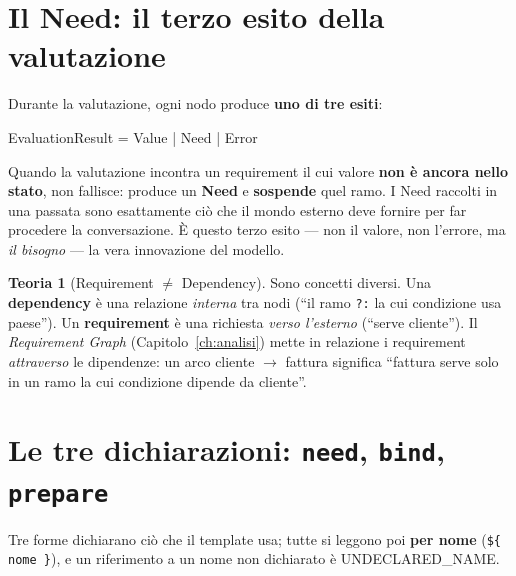 \documentclass[11pt,a4paper]{book}
\let\code\lstinline
\newcommand{\ic}[1]{{\ttfamily #1}}
\theoremstyle{definition}
\newtheorem*{teoria}{Teoria}
\begin{document}
{{{{\section{Il Need: il terzo esito della valutazione}

Durante la valutazione, ogni nodo produce \textbf{uno di tre esiti}:

\begin{center}
\ttfamily EvaluationResult = Value | Need | Error
\end{center}

Quando la valutazione incontra un requirement il cui valore \textbf{non è ancora
nello stato}, non fallisce: produce un \textbf{Need} e \textbf{sospende} quel ramo.
I \ic{Need} raccolti in una passata sono esattamente ciò che il mondo esterno deve
fornire per far procedere la conversazione. È questo terzo esito --- non il valore,
non l'errore, ma \emph{il bisogno} --- la vera innovazione del modello.

\begin{teoria}[Requirement $\neq$ Dependency]
Sono concetti diversi. Una \textbf{dependency} è una relazione \emph{interna} tra
nodi (``il ramo \code|?:| la cui condizione usa \ic{paese}''). Un
\textbf{requirement} è una richiesta \emph{verso l'esterno} (``serve
\ic{cliente}''). Il \emph{Requirement Graph} (Capitolo~\ref{ch:analisi}) mette in
relazione i requirement \emph{attraverso} le dipendenze: un arco
\ic{cliente} $\rightarrow$ \ic{fattura} significa ``fattura serve solo in un ramo
la cui condizione dipende da cliente''.
\end{teoria}

\section{Le tre dichiarazioni: \texttt{need}, \texttt{bind}, \texttt{prepare}}

Tre forme dichiarano ciò che il template usa; tutte si leggono poi \textbf{per
nome} (\code|${ nome }|), e un riferimento a un nome non dichiarato è
\ic{UNDECLARED\_NAME}.

}}}}
\end{document}
